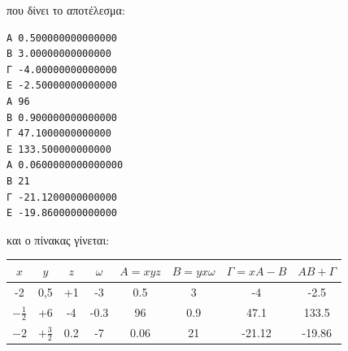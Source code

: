 που δίνει το αποτέλεσμα:
\begin{lstlisting}
A 0.500000000000000
B 3.00000000000000
Γ -4.00000000000000
Ε -2.50000000000000
A 96
B 0.900000000000000
Γ 47.1000000000000
Ε 133.500000000000
A 0.0600000000000000
B 21
Γ -21.1200000000000
Ε -19.8600000000000
\end{lstlisting}
και ο πίνακας γίνεται:
\begin{table}[h]
\begin{tabular}{|c|c|c|c|c|c|c|c|}
$x$&$y$&$z$&$\omega$&$A=xyz$&$B=yx\omega$&$\Gamma=xA-B$&$AB+\Gamma$\\\hline
-2& 0,5& +1& -3&0.5&3&-4&-2.5\\\hline
$-\frac{1}{2}$&+6&-4&-0.3&96&0.9&47.1&133.5\\\hline
$-2$&$+\frac{3}{2}$&0.2&-7&0.06&21&-21.12&-19.86\\\hline
\end{tabular}
\end{table}
